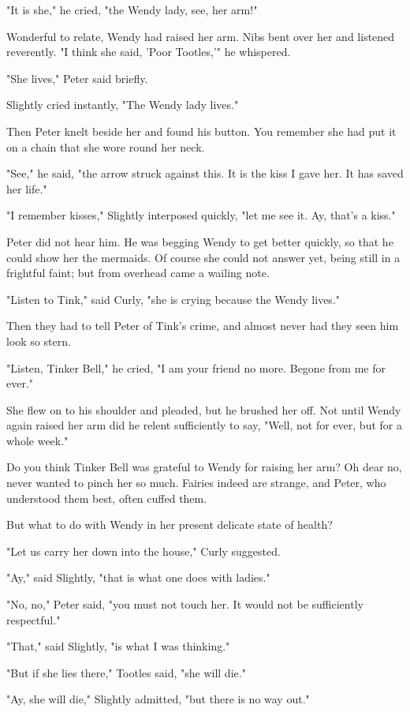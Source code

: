 "It is she," he cried, "the Wendy lady, see, her arm!"

Wonderful to relate, Wendy had raised her arm.
Nibs bent over her and listened reverently.
"I think she said, 'Poor Tootles,'" he whispered.

"She lives," Peter said briefly.

Slightly cried instantly, "The Wendy lady lives."

Then Peter knelt beside her and found his button.
You remember she had put it on a chain that she wore round her neck.

"See," he said, "the arrow struck against this.
It is the kiss I gave her.
It has saved her life."

"I remember kisses," Slightly interposed quickly, "let me see it.
Ay, that's a kiss."

Peter did not hear him.
He was begging Wendy to get better quickly, so that he could show her the mermaids.
Of course she could not answer yet, being still in a frightful faint;
but from overhead came a wailing note.

"Listen to Tink," said Curly, "she is crying because the Wendy lives."

Then they had to tell Peter of Tink's crime, and almost never had they seen him look so stern.

"Listen, Tinker Bell," he cried, "I am your friend no more.
Begone from me for ever."

She flew on to his shoulder and pleaded, but he brushed her off.
Not until Wendy again raised her arm did he relent sufficiently to say,
"Well, not for ever, but for a whole week."

Do you think Tinker Bell was grateful to Wendy for raising her arm?
Oh dear no, never wanted to pinch her so much.
Fairies indeed are strange, and Peter, who understood them best, often cuffed them.

But what to do with Wendy in her present delicate state of health?

"Let us carry her down into the house," Curly suggested.

"Ay," said Slightly, "that is what one does with ladies."

"No, no," Peter said, "you must not touch her.
It would not be sufficiently respectful."

"That," said Slightly, "is what I was thinking."

"But if she lies there," Tootles said, "she will die."

"Ay, she will die," Slightly admitted, "but there is no way out."

